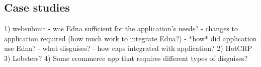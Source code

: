 \subsection{Case studies}
   1) websubmit
      - was Edna sufficient for the application's needs?
      - changes to application required (how much work to integrate Edna?)
      - *how* did application use Edna?
        - what disguises?
        - how caps integrated with application?
   2) HotCRP
   3) Lobsters?
   4) Some ecommerce app that requires different types of disguises?
